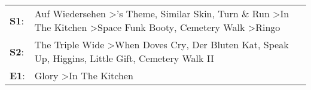 \begin{supertabular}{p{0.03\textwidth}p{0.92\textwidth}}
 \textbf{S1}:  &  Auf Wiedersehen\textsuperscript{} \textgreater {}'s Theme\textsuperscript{}, \enspace Similar Skin\textsuperscript{}, \enspace Turn \& Run\textsuperscript{} \textgreater \enspace In The Kitchen\textsuperscript{} \textgreater \enspace Space Funk Booty\textsuperscript{}, \enspace Cemetery Walk\textsuperscript{} \textgreater \enspace Ringo\textsuperscript{}  \enspace  \\
 \textbf{S2}:  &                                                                              The Triple Wide\textsuperscript{} \textgreater \enspace When Doves Cry\textsuperscript{}, \enspace Der Bluten Kat\textsuperscript{}, \enspace Speak Up\textsuperscript{}, \enspace Higgins\textsuperscript{}, \enspace Little Gift\textsuperscript{}, \enspace Cemetery Walk II\textsuperscript{}  \enspace  \\
 \textbf{E1}:  &                                                                                                                                                                                                                                                                                                 Glory\textsuperscript{} \textgreater \enspace In The Kitchen\textsuperscript{}  \enspace  \\
\end{supertabular}
